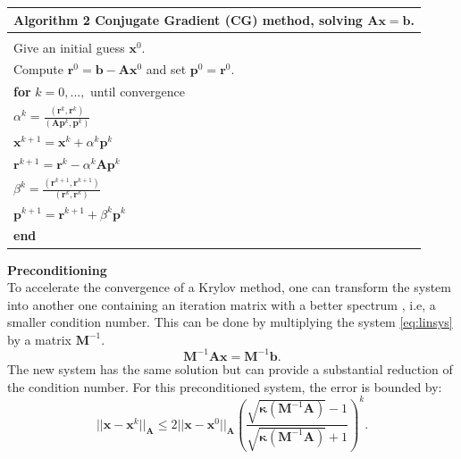 \documentclass[12pt]{article}
\begin{document}
 \begin{table}[!h]
\begin{tabular}{ |l| } 
\hline
  \textbf{Algorithm 2} Conjugate Gradient (CG) method, solving $\mathbf{A}\mathbf{x}=\mathbf{b}$.\\
  \hline
 \hline
\\
Give an initial guess $\mathbf{x}^0$. \\Compute $\mathbf{r}^0=\mathbf{b}-\mathbf{A}\mathbf{x}^0$ and set $\mathbf{p}^0=\mathbf{r}^0$.\\

\hspace{0.5cm}\textbf{for} $k=0,...,$ until convergence\\
 \hspace{1cm} $\alpha^k=\frac{(\mathbf{r}^{k},\mathbf{r}^{k})}{(\mathbf{A}\mathbf{p}^k,\mathbf{p}^k)}$\\
\hspace{1cm} $\mathbf{x}^{k+1}=\mathbf{x}^k+\alpha^k\mathbf{p}^k$\\
\hspace{1cm}$\mathbf{r}^{k+1}=\mathbf{r}^k-\alpha^k\mathbf{A}\mathbf{p}^k$\\
\hspace{1cm}$ \beta^k=\frac{(\mathbf{r}^{k+1},\mathbf{r}^{k+1})}{(\mathbf{r}^k,\mathbf{r}^k)}$\\
\hspace{1cm}$\mathbf{p}^{k+1}=\mathbf{r}^{k+1}+\beta^k\mathbf{p}^k$\\
\hspace{0.5cm}\textbf{end}\\
\hline
\end{tabular}
\end{table}
\newpage
\textbf{Preconditioning}\\
\hspace{0.5cm}To accelerate the convergence of a Krylov method, one can transform the system into
another one containing an iteration matrix with a better spectrum , i.e, a smaller condition number. 
This can be done by multiplying the system \eqref{eq:linsys} by a matrix $\mathbf{M}^{-1}.$
\begin{equation}\label{eq:precon}
 \mathbf{M}^{-1}\mathbf{A}\mathbf{x}=\mathbf{M}^{-1}\mathbf{b}.
\end{equation}
The new system has the same solution but can provide a substantial reduction of the condition number. 
For this preconditioned system, the error is bounded by:
\begin{equation}\label{eq:convp}
 ||\mathbf{x}-\mathbf{x}^{k}||_\mathbf{A}\leq 2||\mathbf{x}-\mathbf{x}^{0}||_\mathbf{A} 
 \left( \frac{\sqrt{\mathbf{\kappa}(\mathbf{M}^{-1}\mathbf{A})}-1}{\sqrt{\mathbf{\kappa}(\mathbf{M}^{-1}\mathbf{A})}+1} \right)^{k}.
\end{equation}
\end{document}
